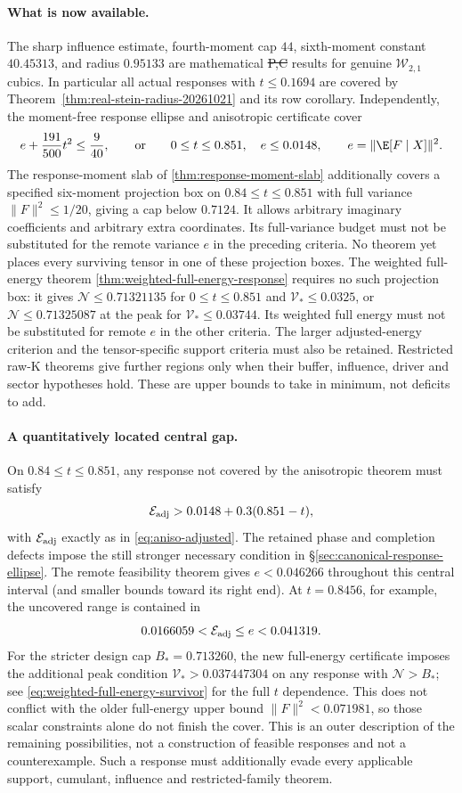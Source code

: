 \paragraph{What is now available.}
The sharp influence estimate, fourth-moment cap $44$, sixth-moment
constant $40.45313$, and radius $0.95133$ are mathematical
\st{P,C} results for genuine $\mathcal W_{2,1}$ cubics.
In particular all actual responses with $t\le0.1694$ are covered by
Theorem~\ref{thm:real-stein-radius-20261021} and its row corollary.
Independently, the moment-free response ellipse and anisotropic
certificate cover
\[
 e+\frac{191}{500}t^2\le\frac9{40},\qquad\text{or}\qquad
 0\le t\le0.851,\quad e\le0.0148,
 \qquad e=\|\E[F\mid X]\|^2.
\]
The response-moment slab of \autoref{thm:response-moment-slab} additionally
covers a specified six-moment projection box on $0.84\le t\le0.851$
with full variance $\|F\|^2\le1/20$, giving a cap below $0.7124$.
It allows arbitrary imaginary coefficients and arbitrary extra coordinates.
Its full-variance budget must not be substituted for the remote variance $e$
in the preceding criteria. No theorem yet places every surviving tensor in
one of these projection boxes.
The weighted full-energy theorem
\ref{thm:weighted-full-energy-response} requires no such projection box:
it gives $\mathcal N\le0.71321135$ for $0\le t\le0.851$ and
$\mathcal V_*\le0.0325$, or $\mathcal N\le0.71325087$ at the peak
for $\mathcal V_*\le0.03744$. Its weighted full energy must not be
substituted for remote $e$ in the other criteria.
The larger adjusted-energy criterion and the tensor-specific support
criteria must also be retained. Restricted raw-K theorems give further
regions only when their buffer, influence, driver and sector hypotheses
hold. These are upper bounds to take in minimum, not deficits to add.

\paragraph{A quantitatively located central gap.}
On $0.84\le t\le0.851$, any response not covered by the anisotropic
theorem must satisfy
\[
 \mathcal E_{\rm adj}>0.0148+0.3(0.851-t),
\]
with $\mathcal E_{\rm adj}$ exactly as in
\eqref{eq:aniso-adjusted}. The retained phase and completion defects
impose the still stronger necessary condition in
\S\ref{sec:canonical-response-ellipse}.
The remote feasibility theorem gives $e<0.046266$ throughout this
central interval (and smaller bounds toward its right end).
At $t=0.8456$, for example, the uncovered range is contained in
\[
 0.0166059<\mathcal E_{\rm adj}\le e<0.041319.
\]
For the stricter design cap $B_*=0.713260$, the new full-energy
certificate imposes the additional peak condition
$\mathcal V_*>0.037447304$ on any response with $\mathcal N>B_*$;
see \eqref{eq:weighted-full-energy-survivor} for the full $t$ dependence.
This does not conflict with the older full-energy upper bound
$\|F\|^2<0.071981$, so those scalar constraints alone do not finish
the cover.
This is an outer description of the remaining possibilities, not a
construction of feasible responses and not a counterexample. Such a
response must additionally evade every applicable support, cumulant,
influence and restricted-family theorem.

